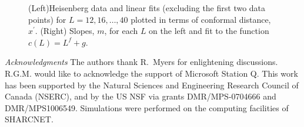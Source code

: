 \documentclass[prl,aps,twocolumn,floatfix,amsmath,amssymb,superscriptaddress,tightenlines]{revtex4}
\begin{document}
 \begin{figure}[ht]
   \begin{center}
   \end{center}
   \caption{(Left)Heisenberg data and linear fits (excluding the first two data points) for $L=12,16,\dots,40$ plotted in terms of conformal distance, $x^\prime$.
   (Right) Slopes, $m$, for each $L$ on the left {\color{red} and fit to the function $c(L)=L^f+g$}. 
   }
   \label{fig:heis_lines}
 \end{figure}



{\it Acknowledgments} 
The authors thank R.~Myers for enlightening discussions. 
R.G.M. would like to acknowledge the support of Microsoft Station Q.
This work has been supported by the Natural Sciences and Engineering
Research Council of Canada (NSERC), and by the US NSF via grants DMR/MPS-0704666 and DMR/MPS1006549.  Simulations were performed on the computing facilities of SHARCNET.



\end{document}
